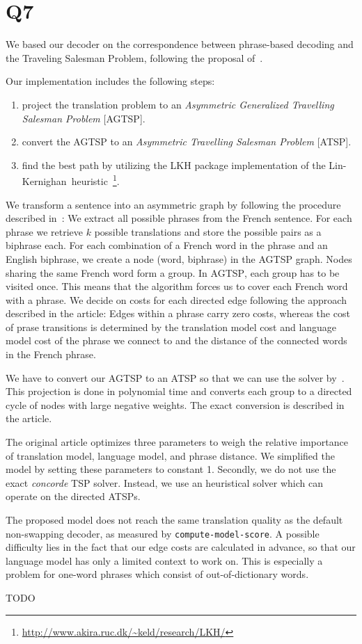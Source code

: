 \section*{Q7}

We based our decoder on the correspondence between phrase-based decoding and
the Traveling Salesman Problem, following the proposal
of~\cite{zaslavskiy2009}.

Our implementation includes the following steps:
\begin{enumerate}
    \item project the translation problem to an \emph{Asymmetric Generalized
        Travelling Salesman Problem} [\textsc{AGTSP}].
    \item convert the \textsc{AGTSP} to an \emph{Asymmetric Travelling
        Salesman Problem} [\textsc{ATSP}].
    \item find the best path by utilizing the LKH package implementation of the
        Lin-Kernighan~heuristic~\cite{Helsgaun2006}\footnote{\url{http://www.akira.ruc.dk/~keld/research/LKH/}}.
\end{enumerate}

We transform a sentence into an asymmetric graph by following the procedure
described in~\cite{zaslavskiy2009}: We extract all possible phrases from the
French sentence. For each phrase we retrieve $k$ possible translations and
store the possible pairs as a biphrase each. For each combination of a French word in the
phrase and an English biphrase, we create a node (word, biphrase) in the
\textsc{AGTSP} graph. Nodes sharing the same French word form a group. In
\textsc{AGTSP}, each group has to be visited once. This means that the
algorithm forces us to cover each French word with a phrase. We decide on
costs for each directed edge following the approach described in the
article: Edges within a phrase carry zero costs, whereas the cost of prase
transitions is determined by the translation model cost and language model
cost of the phrase we connect to and the distance of the connected words in
the French phrase.

We have to convert our \textsc{AGTSP} to an \textsc{ATSP} so that we can use
the solver by~\cite{Helsgaun2006}. This projection is done in polynomial
time and converts each group to a directed cycle of nodes with large
negative weights. The exact conversion is described in the article.

The original article optimizes three parameters to weigh the relative
importance of translation model, language model, and phrase distance.
We simplified the model by setting these parameters to constant 1. Secondly,
we do not use the exact \emph{concorde} \textsc{TSP} solver. Instead, we use
an heuristical solver which can operate on the directed \textsc{ATSP}s.

The proposed model does not reach the same translation quality as the
default non-swapping decoder, as measured by \texttt{compute-model-score}.
A possible difficulty lies in the fact that our edge costs are calculated in
advance, so that our language model has only a limited context to work on.
This is especially a problem for one-word phrases which consist of
out-of-dictionary words.

TODO
